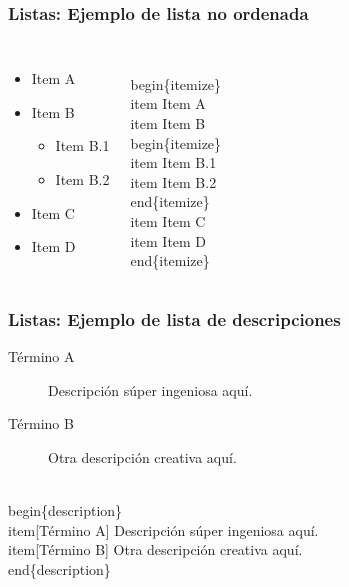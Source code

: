 \begin{frame}[fragile]
\frametitle{Listas: Ejemplo de lista no ordenada}
\begin{columns}

    \begin{itemize}
    \item Item A
    \item Item B
        \begin{itemize}
            \item Item B.1
            \item Item B.2
        \end{itemize}
    \item Item C
    \item Item D
    \end{itemize}

\begin{semiverbatim}
\\begin\{itemize\}
    \\item Item A
    \\item Item B
        \\begin\{itemize\}
            \\item Item B.1
            \\item Item B.2
        \\end\{itemize\}
    \\item Item C
    \\item Item D
\\end\{itemize\}
\end{semiverbatim}
\end{columns}
\end{frame}

\begin{frame}[fragile]
\frametitle{Listas: Ejemplo de lista de descripciones}
\begin{description}
   \item[Término A] Descripción súper ingeniosa aquí.
   \item[Término B] Otra descripción creativa aquí.
\end{description}

\vspace{0.5cm}

\begin{semiverbatim}
\\begin\{description\}
   \\item[Término A] Descripción súper ingeniosa aquí.
   \\item[Término B] Otra descripción creativa aquí.
\\end\{description\}
\end{semiverbatim}
\end{frame}

